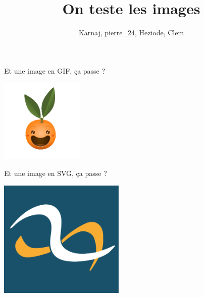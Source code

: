 \documentclass[small]{zmdocument}
\title{On teste les images}
\author{Karnaj, pierre\_24, Heziode, Clem}
\begin{document}
\maketitle
\tableofcontents

\levelOneIntroduction


Et une image en GIF, ça passe ?

\begin{center}
\includegraphics[width=4cm]{test-images/image_in_gif.gif}
\end{center}

Et une image en SVG, ça passe ?

\begin{center}
\includegraphics[width=6cm]{test-images/image_in_svg.svg}
\end{center}
\end{document}

